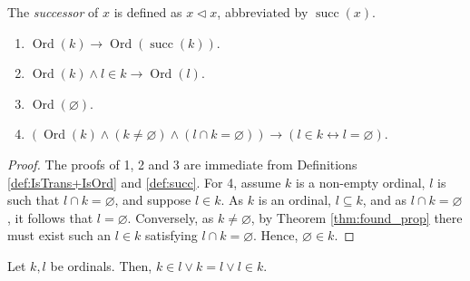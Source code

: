 \begin{definition}[Successor]
    \label{def:succ}
    \leanok
    The \textit{successor} of $x$ is defined as $x \lhd x$, abbreviated by $\operatorname{succ}(x)$.
\end{definition}

\begin{lemma}
    \label{lem:IsOrd.succ_isOrd+...+IsOrd.empty_is_mem}
    \leanok
    \leavevmode
    \begin{enumerate}
        \item $\operatorname{Ord}(k) \rightarrow \operatorname{Ord}(\operatorname{succ}(k))$.
        \item $\operatorname{Ord}(k) \land l \in k \rightarrow \operatorname{Ord}(l)$.
        \item $\operatorname{Ord}(\varnothing)$.
        \item $(\operatorname{Ord}(k) \land (k \neq \varnothing) \land 
        (l \cap k = \varnothing))\rightarrow(l \in k \leftrightarrow l = \varnothing)$.
    \end{enumerate}
\end{lemma}

\begin{proof}
    \leanok
    \leavevmode
    The proofs of 1, 2 and 3 are immediate from Definitions \ref{def:IsTrans+IsOrd} and 
    \ref{def:succ}.
    For 4, assume $k$ is a non-empty ordinal, $l$ is such that $l \cap k = \varnothing$, 
    and suppose $l \in k$. As $k$ is an ordinal, $l \subseteq k$, and as $l \cap k = \varnothing$, 
    it follows that $l=\varnothing$.
    Conversely, as $k \neq \varnothing$, by Theorem \ref{thm:found_prop} there must exist such 
    an $l \in k$ satisfying $l \cap k = \varnothing$. Hence, $\varnothing \in k$.
\end{proof}

\begin{theorem}
    \label{thm:IsOrd.comparability}
    \leanok
    Let $k,l$ be ordinals. Then, $k \in l \lor k = l \lor l \in k$.
\end{theorem}

